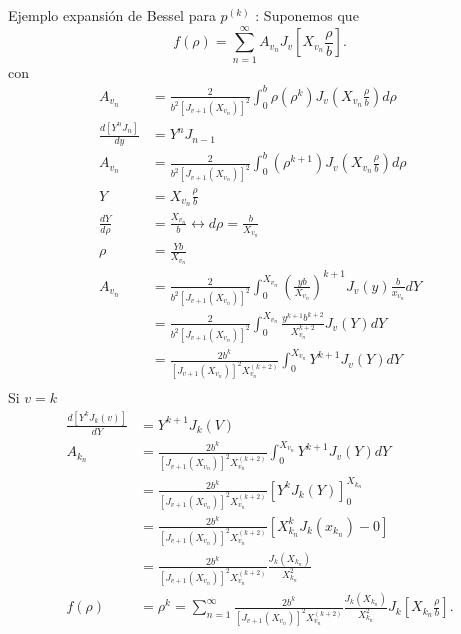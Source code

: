 \documentclass[12pt]{exam}
\begin{document}
\begin{enumerate}
    Ejemplo expansión de Bessel para $p^{(k)}$ :
        Suponemos que \[
    f\left( \rho \right) = \sum_{n=1}^{\infty} A_{v_n} J_v\left[ X_{v_n}\frac{\rho}{b} \right]
    .\] con
    \begin{align*}
      A_{v_n} &= \frac{2}{b^2\left[ J_{v + 1}\left( X_{v_n} \right) \right]^2}\int_{0}^{b}\rho\left( \rho^{k} \right) J_v\left( X_{v_n}\frac{\rho}{b} \right) d\rho\\
      \frac{d\left[ Y^{n}J_n \right] }{dy} &= Y^{n}J_{n - 1}\\
      A_{v_n} &= \frac{2}{b^2\left[ J_{v + 1}\left( X_{v_n} \right) \right]^2}\int_{0}^{b}\left( \rho^{k + 1} \right) J_v\left( X_{v_n}\frac{\rho}{b} \right) d\rho\\
      Y &= X_{v_n}\frac{\rho}{b} \\
      \frac{dY}{d\rho} &= \frac{X_{v_n}}{b} \leftrightarrow d\rho = \frac{b}{X_{v_n}} \\
      \rho &= \frac{Y b}{X_{v_n}} \\
      A_{v_n} &= \frac{2}{b^2\left[ J_{v + 1}\left( X_{v_n} \right)  \right]^2}\int_0^{X_{v_n}}\left( \frac{yb}{X_{v_n}} \right)^{k + 1}J_{v}\left( y \right) \frac{b}{x_{v_n}}dY\\
	      &= \frac{2}{b^2 \left[ J_{v+1}\left( X_{v_n} \right)  \right]^2}\int_{0}^{X_{v_n}}\frac{y^{k + 1}b^{k + 2}}{X_{v_n}^{k + 2}}J_v\left( Y \right) dY \\
	      &= \frac{2b^{k}}{\left[ J_{v+1}\left( X_{v_n} \right)  \right]^2 X_{v_n}^{(k + 2)} }\int_0^{X_{v_n}}Y^{k + 1}J_v\left( Y \right) dY \\
    \end{align*}
    Si $v = k$
    \begin{align*}
      \frac{d\left[ Y^{k}J_k\left( v \right)  \right] }{dY} &= Y^{k + 1}J_{k}\left( V \right)  \\
      A_{k_n} &= \frac{2b^{k}}{\left[ J_{v+1}\left( X_{v_n} \right)  \right]^2 X_{v_n}^{(k + 2)} }\int_0^{X_{v_n}}Y^{k + 1}J_v\left( Y \right) dY \\
      &= \frac{2b^{k}}{\left[ J_{v+1}\left( X_{v_n} \right)  \right]^2 X_{v_n}^{(k + 2)} }\left[ Y^{k}J_k\left( Y \right) \right]_0^{X_{k_n}}\\
      &=  \frac{2b^{k}}{\left[ J_{v+1}\left( X_{v_n} \right)  \right]^2 X_{v_n}^{(k + 2)} }  \left[ X_{k_n}^{k}J_k\left( x_{k_n} \right) - 0 \right] \\
      &= \frac{2b^{k}}{\left[ J_{v+1}\left( X_{v_n} \right)  \right]^2 X_{v_n}^{(k + 2)} } \frac{J_k\left( X_{k_n} \right) }{X^2_{k_n}} \\
      f\left( \rho \right) &= \rho^{k} = \sum_{n=1}^{\infty} \frac{2b^{k}}{\left[ J_{v+1}\left( X_{v_n} \right)  \right]^2 X_{v_n}^{(k + 2)} }\frac{J_k\left( X_{k_n} \right) }{X^2_{k_n}} J_k \left[ X_{k_n} \frac{\rho}{b} \right]
    .\end{align*}


\end{enumerate}
\end{document}

